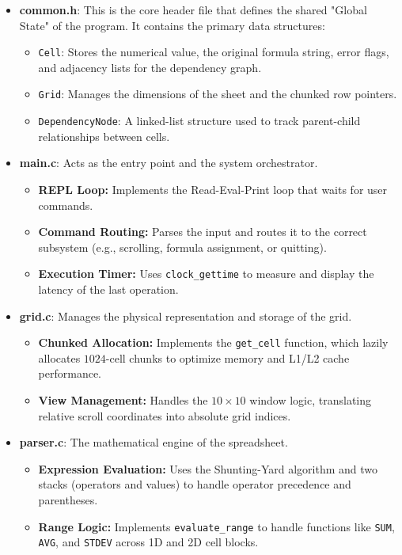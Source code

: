 \documentclass[twocolumn]{article}
\begin{document}
\begin{itemize}
    \item \textbf{common.h}: 
    This is the core header file that defines the shared "Global State" of the program. It contains the primary data structures:
    \begin{itemize}
        \item \texttt{Cell}: Stores the numerical value, the original formula string, error flags, and adjacency lists for the dependency graph.
        \item \texttt{Grid}: Manages the dimensions of the sheet and the chunked row pointers.
        \item \texttt{DependencyNode}: A linked-list structure used to track parent-child relationships between cells.
    \end{itemize}

    \item \textbf{main.c}: 
    Acts as the entry point and the system orchestrator.
    \begin{itemize}
        \item \textbf{REPL Loop:} Implements the Read-Eval-Print loop that waits for user commands.
        \item \textbf{Command Routing:} Parses the input and routes it to the correct subsystem (e.g., scrolling, formula assignment, or quitting).
        \item \textbf{Execution Timer:} Uses \texttt{clock\_gettime} to measure and display the latency of the last operation.
    \end{itemize}

    \item \textbf{grid.c}: 
    Manages the physical representation and storage of the grid.
    \begin{itemize}
        \item \textbf{Chunked Allocation:} Implements the \texttt{get\_cell} function, which lazily allocates $1024$-cell chunks to optimize memory and L1/L2 cache performance.
        \item \textbf{View Management:} Handles the $10\times10$ window logic, translating relative scroll coordinates into absolute grid indices.
    \end{itemize}

    \item \textbf{parser.c}: 
    The mathematical engine of the spreadsheet.
    \begin{itemize}
        \item \textbf{Expression Evaluation:} Uses the Shunting-Yard algorithm and two stacks (operators and values) to handle operator precedence and parentheses.
        \item \textbf{Range Logic:} Implements \texttt{evaluate\_range} to handle functions like \texttt{SUM}, \texttt{AVG}, and \texttt{STDEV} across 1D and 2D cell blocks.
    \end{itemize}


\end{itemize}
\end{document}
